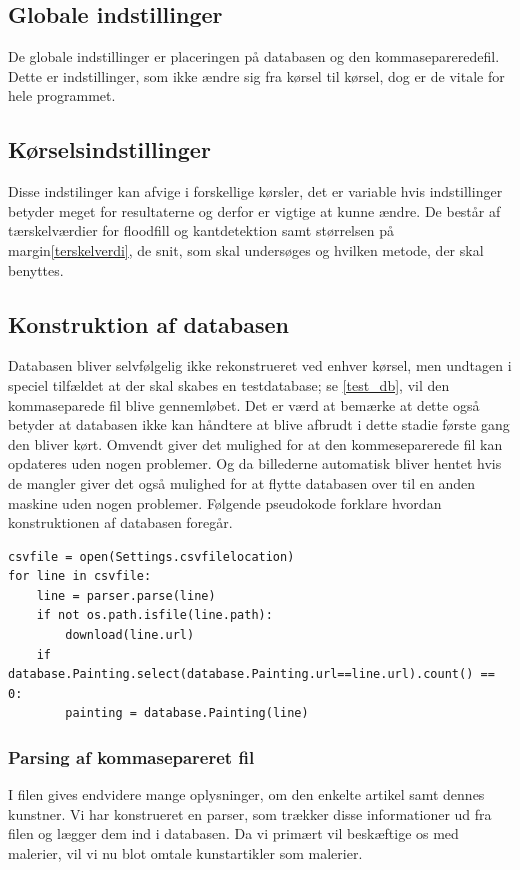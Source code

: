 {\subsection{Globale indstillinger}
De globale indstillinger er placeringen på databasen og den
kommasepareredefil. Dette er indstillinger, som ikke ændre sig fra
kørsel til kørsel, dog er de vitale for hele programmet.

\subsection{Kørselsindstillinger}
Disse indstilinger kan afvige i forskellige kørsler, det er variable
hvis indstillinger betyder meget for resultaterne og derfor er vigtige
at kunne ændre. De består af tærskelværdier for floodfill og
kantdetektion samt størrelsen på margin\ref{terskelverdi}, de snit, som
skal undersøges og hvilken metode, der skal benyttes.

\subsection{Konstruktion af databasen}
Databasen bliver selvfølgelig ikke rekonstrueret ved enhver kørsel, men
undtagen i speciel tilfældet at der skal skabes en
testdatabase; se \ref{test_db}, vil den kommaseparede fil blive gennemløbet.
Det er værd at bemærke at dette også betyder at databasen ikke kan
håndtere at blive afbrudt i dette stadie første gang den bliver kørt.
Omvendt giver det mulighed for at den kommeseparerede fil kan opdateres uden nogen
problemer. Og da billederne automatisk bliver hentet hvis de mangler
giver det også mulighed for at flytte databasen over til en anden
maskine uden nogen problemer. Følgende pseudokode forklare hvordan
konstruktionen af databasen foregår.
\begin{lstlisting}[caption={Pseudokode for database
initialisering},frame=tb,label={pseudo_init_db}]
csvfile = open(Settings.csvfilelocation)
for line in csvfile:
	line = parser.parse(line)
	if not os.path.isfile(line.path):
		download(line.url)
	if database.Painting.select(database.Painting.url==line.url).count() == 0:
		painting = database.Painting(line)
\end{lstlisting}
\subsubsection{Parsing af kommasepareret fil}
I filen gives endvidere mange oplysninger, om den enkelte artikel samt
dennes kunstner.  Vi har konstrueret en parser, som trækker disse
informationer ud fra filen og lægger dem ind i databasen. Da vi primært
vil beskæftige os med malerier, vil vi nu blot omtale kunstartikler som
malerier.

}
